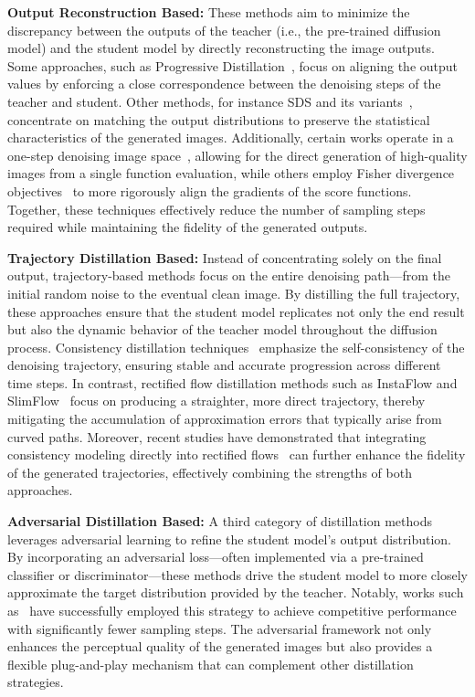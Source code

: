 \textbf{Output Reconstruction Based:} These methods aim to minimize the discrepancy between the outputs of the teacher (i.e., the pre-trained diffusion model) and the student model by directly reconstructing the image outputs. Some approaches, such as Progressive Distillation~\cite{salimans2022progressive, berthelot2023tract}, focus on aligning the output values by enforcing a close correspondence between the denoising steps of the teacher and student. Other methods, for instance SDS and its variants~\cite{poole2022dreamfusion, wang2024prolificdreamer, yin2024one, yin2024improved}, concentrate on matching the output distributions to preserve the statistical characteristics of the generated images. Additionally, certain works operate in a one-step denoising image space~\cite{lukoianov2024score, karras2022elucidating}, allowing for the direct generation of high-quality images from a single function evaluation, while others employ Fisher divergence objectives~\cite{zhou2024score, zhou2024adversarial} to more rigorously align the gradients of the score functions. Together, these techniques effectively reduce the number of sampling steps required while maintaining the fidelity of the generated outputs.

\textbf{Trajectory Distillation Based:} Instead of concentrating solely on the final output, trajectory-based methods focus on the entire denoising path—from the initial random noise to the eventual clean image. By distilling the full trajectory, these approaches ensure that the student model replicates not only the end result but also the dynamic behavior of the teacher model throughout the diffusion process. Consistency distillation techniques~\cite{song2023consistency, kim2023consistency, lu2024simplifying} emphasize the self-consistency of the denoising trajectory, ensuring stable and accurate progression across different time steps. In contrast, rectified flow distillation methods such as InstaFlow and SlimFlow~\cite{liu2023instaflow, zhu2025slimflow} focus on producing a straighter, more direct trajectory, thereby mitigating the accumulation of approximation errors that typically arise from curved paths. Moreover, recent studies have demonstrated that integrating consistency modeling directly into rectified flows~\cite{frans2024one} can further enhance the fidelity of the generated trajectories, effectively combining the strengths of both approaches.

\textbf{Adversarial Distillation Based:} A third category of distillation methods leverages adversarial learning to refine the student model's output distribution. By incorporating an adversarial loss—often implemented via a pre-trained classifier or discriminator—these methods drive the student model to more closely approximate the target distribution provided by the teacher. Notably, works such as~\cite{sauer2024fast, sauer2025adversarial} have successfully employed this strategy to achieve competitive performance with significantly fewer sampling steps. The adversarial framework not only enhances the perceptual quality of the generated images but also provides a flexible plug-and-play mechanism that can complement other distillation strategies.